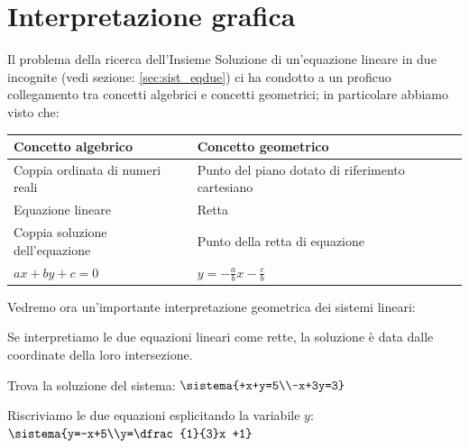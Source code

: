 \section{Interpretazione grafica}
Il problema della ricerca dell'Insieme Soluzione di
un'equazione lineare in due incognite (vedi sezione: \ref{sec:sist_eqdue}) 
ci ha condotto a un proficuo collegamento tra concetti algebrici e 
concetti geometrici; in particolare abbiamo visto che:

\begin{center}
\begin{tabularx}{1\textwidth}{ll}%
\toprule
Concetto algebrico & Concetto geometrico\\
\midrule
Coppia ordinata di numeri reali & Punto del piano dotato di riferimento 
cartesiano\\
Equazione lineare & Retta \\
Coppia soluzione dell'equazione& Punto della retta di equazione \\
\(ax+by+c=0\) & \(y=-{\frac{a}{b}}x-\frac{c}{b}\)\\
\bottomrule
 \end{tabularx}

\end{center}
Vedremo ora un'importante interpretazione geometrica dei sistemi lineari:

\begin{definizione}{}{}
Se interpretiamo le due equazioni lineari come rette, la soluzione è data 
dalle coordinate della loro intersezione.
\end{definizione}

\begin{esempio}{}{}
Trova la soluzione del sistema: \quad 
\(\sistema{+x+y=5\\-x+3y=3}\)

\medskip
Riscriviamo le due equazioni esplicitando la variabile \(y\):
\(\sistema{y=-x+5\\y=\dfrac{1}{3}x +1}\)

\end{esempio}

